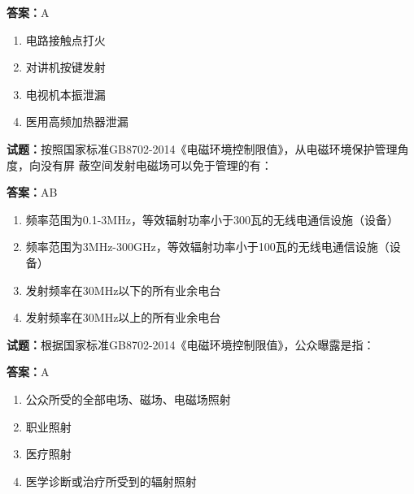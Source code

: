 \documentclass{ctexbook}
\begin{document}
\textbf{答案：}A 

\begin{enumerate}[leftmargin=3em]
  \item 电路接触点打火 

  \item 对讲机按键发射 

  \item 电视机本振泄漏 

  \item 医用高频加热器泄漏 

\end{enumerate}





\vspace{1em}

\textbf{试题：}按照国家标准GB8702-2014《电磁环境控制限值》，从电磁环境保护管理角度，向没有屏
蔽空间发射电磁场可以免于管理的有： 

\textbf{答案：}AB 

\begin{enumerate}[leftmargin=3em]
  \item 频率范围为0.1-3MHz，等效辐射功率小于300瓦的无线电通信设施（设备） 

  \item 频率范围为3MHz-300GHz，等效辐射功率小于100瓦的无线电通信设施（设备） 

  \item 发射频率在30MHz以下的所有业余电台 

  \item 发射频率在30MHz以上的所有业余电台 

\end{enumerate}





\vspace{1em}

\textbf{试题：}根据国家标准GB8702-2014《电磁环境控制限值》，公众曝露是指： 

\textbf{答案：}A 

\begin{enumerate}[leftmargin=3em]
  \item 公众所受的全部电场、磁场、电磁场照射 


  \item 职业照射 

  \item 医疗照射 

  \item 医学诊断或治疗所受到的辐射照射 

\end{enumerate}
\end{document}
